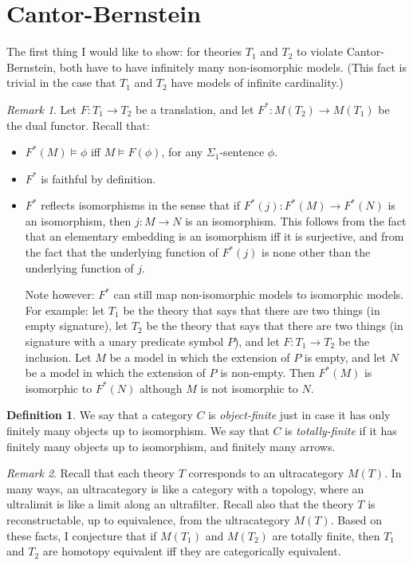 \documentclass[12pt]{article}
\theoremstyle{definition}
\newtheorem*{defn}{Definition}
\theoremstyle{remark}
\newtheorem*{note}{Remark}
\newcommand{\3}{\mathcal}
\begin{document}
\section{Cantor-Bernstein}

The first thing I would like to show: for theories $T_1$ and $T_2$ to
violate Cantor-Bernstein, both have to have infinitely many
non-isomorphic models. (This fact is trivial in the case that $T_1$
and $T_2$ have models of infinite cardinality.)

\begin{note} Let $F:T_1\to T_2$ be a translation, and let
  $F^*:M(T_2)\to M(T_1)$ be the dual functor. Recall that:
  \begin{itemize}
  \item $F^*(M)\vDash \phi$ iff $M\vDash F(\phi )$, for any
    $\Sigma _1$-sentence $\phi$.
    \item $F^*$ is faithful by definition.
    \item $F^*$ reflects isomorphisms in the sense that if
      $F^*(j):F^*(M)\to F^*(N)$ is an isomorphism, then $j:M\to N$ is
      an isomorphism. This follows from the fact that an elementary
      embedding is an isomorphism iff it is surjective, and from the
      fact that the underlying function of $F^*(j)$ is none other than
      the underlying function of $j$.

      Note however: $F^*$ can still map non-isomorphic models to
      isomorphic models. For example: let $T_1$ be the theory that
      says that there are two things (in empty signature), let $T_2$
      be the theory that says that there are two things (in signature
      with a unary predicate symbol $P$), and let $F:T_1\to T_2$ be
      the inclusion. Let $M$ be a model in which the extension of $P$
      is empty, and let $N$ be a model in which the extension of $P$
      is non-empty. Then $F^*(M)$ is isomorphic to $F^*(N)$ although
      $M$ is not isomorphic to $N$.
    \end{itemize} \end{note}

  \begin{defn} We say that a category $C$ is \emph{object-finite} just
    in case it has only finitely many objects up to isomorphism. We
    say that $C$ is \emph{totally-finite} if it has finitely many
    objects up to isomorphism, and finitely many arrows. \end{defn}

  \begin{note} Recall that each theory $T$ corresponds to an
    ultracategory $M(T)$. In many ways, an ultracategory is like a
    category with a topology, where an ultralimit is like a limit
    along an ultrafilter. Recall also that the theory $T$ is
    reconstructable, up to equivalence, from the ultracategory
    $M(T)$. Based on these facts, I conjecture that if $M(T_1)$ and
    $M(T_2)$ are totally finite, then $T_1$ and $T_2$ are homotopy
    equivalent iff they are categorically equivalent. \end{note}
\end{document}
